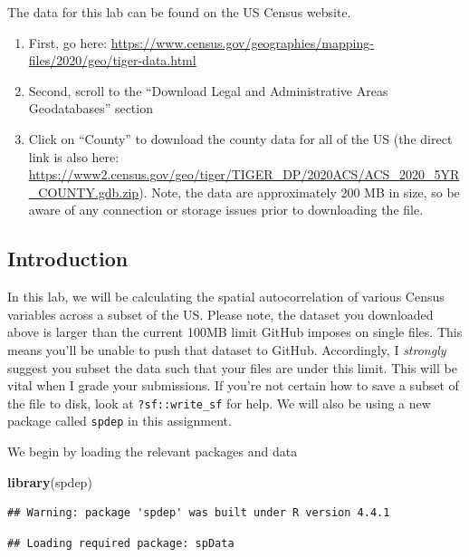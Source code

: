 \documentclass[]{article}
\newenvironment{Shaded}{\begin{snugshade}}{\end{snugshade}}
\newcommand{\FunctionTok}[1]{\textcolor[rgb]{0.13,0.29,0.53}{\textbf{#1}}}
\newcommand{\NormalTok}[1]{#1}
\begin{document}
The data for this lab can be found on the US Census website.

\begin{enumerate}
\def\labelenumi{\arabic{enumi}.}
\item
  First, go here:
  \url{https://www.census.gov/geographies/mapping-files/2020/geo/tiger-data.html}
\item
  Second, scroll to the ``Download Legal and Administrative Areas
  Geodatabases'' section
\item
  Click on ``County'' to download the county data for all of the US (the
  direct link is also here:
  \url{https://www2.census.gov/geo/tiger/TIGER_DP/2020ACS/ACS_2020_5YR_COUNTY.gdb.zip}).
  Note, the data are approximately 200 MB in size, so be aware of any
  connection or storage issues prior to downloading the file.
\end{enumerate}

\subsection{Introduction}\label{introduction}

In this lab, we will be calculating the spatial autocorrelation of
various Census variables across a subset of the US. Please note, the
dataset you downloaded above is larger than the current 100MB limit
GitHub imposes on single files. This means you'll be unable to push that
dataset to GitHub. Accordingly, I \emph{strongly} suggest you subset the
data such that your files are under this limit. This will be vital when
I grade your submissions. If you're not certain how to save a subset of
the file to disk, look at \texttt{?sf::write\_sf} for help. We will also
be using a new package called \texttt{spdep} in this assignment.

We begin by loading the relevant packages and data

\begin{Shaded}
\begin{Highlighting}[]
\FunctionTok{library}\NormalTok{(spdep)}
\end{Highlighting}
\end{Shaded}

\begin{verbatim}
## Warning: package 'spdep' was built under R version 4.4.1
\end{verbatim}

\begin{verbatim}
## Loading required package: spData
\end{verbatim}
\end{document}
